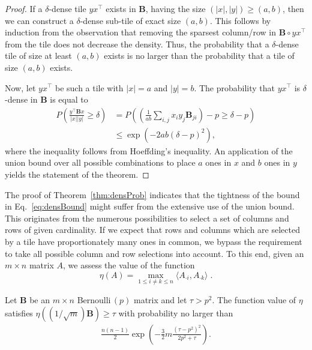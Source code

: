 \begin{proof}
If a $\delta$-dense tile $yx^\top$ exists in $\mathbf{B}$, having the size  $(\lvert x\rvert ,\lvert y\rvert )\geq (a,b)$, then we can construct a $\delta$-dense sub-tile of exact size $(a,b)$. This follows by induction from the observation that removing the sparsest column/row in $\mathbf{B}\circ yx^\top$ from the tile does not decrease the density. Thus, the probability that a $\delta$-dense tile of size at least $(a,b)$ exists is no larger than the probability that a tile of size $(a,b)$ exists.  

Now, let $yx^\top$ be such a tile with $\lvert x\rvert = a$ and $\lvert y\rvert = b$. The probability that $yx^\top$ is $\delta$-dense in $\mathbf{B}$ is equal to
\begin{align*}
P\left(\frac{y^\top \mathbf{B}x}{\lvert x\rvert \lvert y\rvert }\geq \delta\right)
&=P\left(\left(\frac{1}{ab}\sum_{i,j}x_iy_j\mathbf{B}_{ji}\right)-p\geq \delta-p\right)\\
&\leq \exp\left(-2ab(\delta-p)^2\right),
\end{align*}
where the inequality follows from Hoeffding's inequality.
An application of the union bound over all possible combinations to place $a$ ones in $x$ and $b$ ones in $y$ yields the statement of the theorem.
\end{proof}
The proof of Theorem~\ref{thm:densProb} indicates that the tightness of the bound in Eq.~\eqref{eq:densBound} might suffer from the extensive use of the union bound. This originates from the numerous possibilities to select a set of columns and rows of given cardinality. If we expect that rows and columns which are selected by a tile have proportionately many ones in common, we bypass the requirement to take all possible column and row selections into account. To this end, given an $m\times n$ matrix $A$, we assess the value of the function 
\[
\eta(A)= \max_{1\leq i\neq k\leq n} \langle A_{\cdot i},A_{\cdot k}\rangle\;.
\] 
\begin{theorem}\label{thm:cohBound}
Let $\mathbf{B}$ be an $m\times n$ Bernoulli$\,(p)$ matrix and let $\tau>p^2$. The function value of $\eta$ satisfies
$
\eta\left(({1}/\sqrt{m})\mathbf{B}\right) \geq \tau
$
with probability no larger than
\begin{align}\label{eq:cohBound}  
\frac{n(n-1)}{2}\exp\left( -\frac{3}{2}m\frac{(\tau-p^2)^2}{2p^2+\tau}\right). 
\end{align}
\end{theorem}
%
